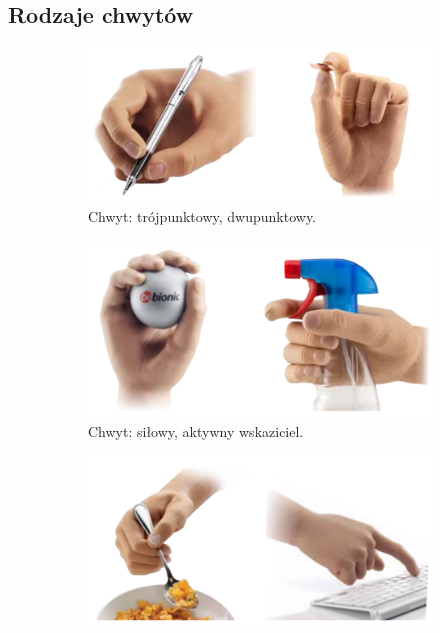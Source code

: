 \documentclass[8pt]{beamer}
\begin{document}
	\subsection{Rodzaje chwytów}
		\begin{frame}[allowframebreaks]
			\begin{center}
				\begin{figure}
				\centering
				\begin{subfigure}[b]{0.4\textwidth}
                		\includegraphics[width=\textwidth]{graphics/grip1.png}
                		\caption{Chwyt: trójpunktowy, dwupunktowy.}
                		\label{graph:g1}
        			\end{subfigure}%
        			\begin{subfigure}[b]{0.4\textwidth}
                		\includegraphics[width=\textwidth]{graphics/grip2.png}
                		\caption{Chwyt: siłowy, aktywny wskaziciel.}
                		\label{graph:g2}
        			\end{subfigure}%
        			\newline
        			\begin{subfigure}[b]{0.4\textwidth}
                		\includegraphics[width=\textwidth]{graphics/grip3.png}

\end{subfigure}
\end{figure}
\end{center}
\end{frame}
\end{document}
